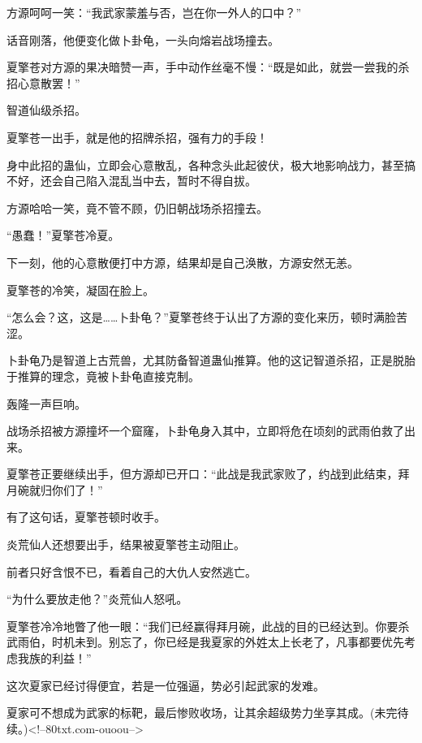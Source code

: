 \begin{this_body}
方源呵呵一笑：“我武家蒙羞与否，岂在你一外人的口中？”

话音刚落，他便变化做卜卦龟，一头向熔岩战场撞去。

夏擎苍对方源的果决暗赞一声，手中动作丝毫不慢：“既是如此，就尝一尝我的杀招心意散罢！”

智道仙级杀招。

夏擎苍一出手，就是他的招牌杀招，强有力的手段！

身中此招的蛊仙，立即会心意散乱，各种念头此起彼伏，极大地影响战力，甚至搞不好，还会自己陷入混乱当中去，暂时不得自拔。

方源哈哈一笑，竟不管不顾，仍旧朝战场杀招撞去。

“愚蠢！”夏擎苍冷夏。

下一刻，他的心意散便打中方源，结果却是自己涣散，方源安然无恙。

夏擎苍的冷笑，凝固在脸上。

“怎么会？这，这是……卜卦龟？”夏擎苍终于认出了方源的变化来历，顿时满脸苦涩。

卜卦龟乃是智道上古荒兽，尤其防备智道蛊仙推算。他的这记智道杀招，正是脱胎于推算的理念，竟被卜卦龟直接克制。

轰隆一声巨响。

战场杀招被方源撞坏一个窟窿，卜卦龟身入其中，立即将危在顷刻的武雨伯救了出来。

夏擎苍正要继续出手，但方源却已开口：“此战是我武家败了，约战到此结束，拜月碗就归你们了！”

有了这句话，夏擎苍顿时收手。

炎荒仙人还想要出手，结果被夏擎苍主动阻止。

前者只好含恨不已，看着自己的大仇人安然逃亡。

“为什么要放走他？”炎荒仙人怒吼。

夏擎苍冷冷地瞥了他一眼：“我们已经赢得拜月碗，此战的目的已经达到。你要杀武雨伯，时机未到。别忘了，你已经是我夏家的外姓太上长老了，凡事都要优先考虑我族的利益！”

这次夏家已经讨得便宜，若是一位强逼，势必引起武家的发难。

夏家可不想成为武家的标靶，最后惨败收场，让其余超级势力坐享其成。(未完待续。)<!--80txt.com-ouoou-->

\end{this_body}

